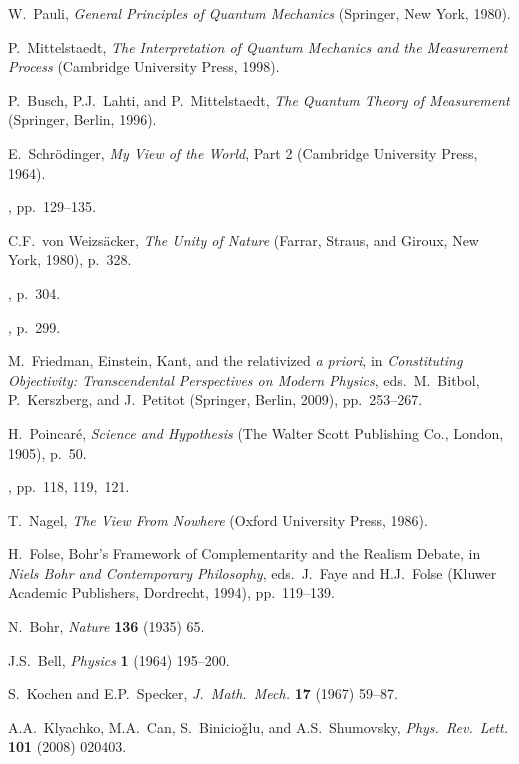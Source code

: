\documentclass[smallextended]{svjour3}
\begin{document}
\begin{thebibliography}{99}
 W.\ Pauli, \textit{General Principles of Quantum Mechanics} (Springer, New York, 1980).

 P.\ Mittelstaedt, \textit{The Interpretation of Quantum Mechanics and the Measurement Process} (Cambridge University Press, 1998). 

 P.\ Busch, P.J.\ Lahti, and P.\ Mittelstaedt, \textit{The Quantum Theory of Measurement} (Springer, Berlin, 1996). 

  E.\ Schr\"odinger, \textit{My View of the World}, Part 2 (Cambridge University Press, 1964).

 \cite{SchrLifeMindMatter1}, pp.\ 129--135.

 C.F.\ von Weizs\"acker, \emph{The Unity of Nature} (Farrar, Straus, and Giroux, New York, 1980), p.~328.

 \cite{KantCPR1}, p.~304.

 \cite{KantCPR1}, p.~299.

 M.\ Friedman, Einstein, Kant, and the relativized \textit{a priori}, in \textit{Constituting Objectivity: Transcendental Perspectives on Modern Physics}, eds.\ M.\ Bitbol, P.\ Kerszberg,  and J.\ Petitot (Springer, Berlin, 2009), pp.\ 253--267.

 H.\ Poincar\'e, \textit{Science and Hypothesis} (The Walter Scott Publishing Co., London, 1905), p.~50.

 \cite{SchrLifeMindMatter1}, pp.\ 118, 119,~121.

 T.\ Nagel, \textit{The View From Nowhere} (Oxford University Press, 1986).

 H.\ Folse, Bohr's Framework of Complementarity and the Realism Debate, in \emph{Niels Bohr and Contemporary Philosophy}, eds.\ J.\ Faye and H.J.\ Folse (Kluwer Academic Publishers, Dordrecht, 1994), pp.\ 119--139. 

 N.\ Bohr, \textit{Nature} \textbf{136} (1935) 65.

 J.S.\ Bell, \textit{Physics} \textbf{1} (1964) 195--200.

 S.\ Kochen and E.P.\ Specker, \textit{J.\ Math.\ Mech.} \textbf{17} (1967) 59--87. 

 A.A.\ Klyachko, M.A.\ Can, S.\ Binicio\v glu, and A.S.\ Shumovsky, \textit{Phys.\ Rev.\ Lett.} \textbf{101} (2008) 020403.


\end{thebibliography}
\end{document}
